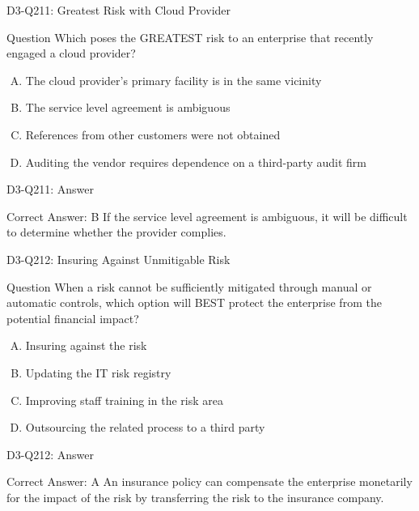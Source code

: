 \documentclass{beamer}
\begin{document}
	\begin{frame}{D3-Q211: Greatest Risk with Cloud Provider}
		\begin{block}{Question}
			Which poses the GREATEST risk to an enterprise that recently engaged a cloud provider?
		\end{block}
		\begin{enumerate}[(A)]
			\item The cloud provider's primary facility is in the same vicinity
			\item The service level agreement is ambiguous
			\item References from other customers were not obtained
			\item Auditing the vendor requires dependence on a third-party audit firm
		\end{enumerate}
	\end{frame}
	\begin{frame}{D3-Q211: Answer}
		\begin{block}{Correct Answer: B}
			If the service level agreement is ambiguous, it will be difficult to determine whether the provider complies.
		\end{block}
	\end{frame}
	
	\begin{frame}{D3-Q212: Insuring Against Unmitigable Risk}
		\begin{block}{Question}
			When a risk cannot be sufficiently mitigated through manual or automatic controls, which option will BEST protect the enterprise from the potential financial impact?
		\end{block}
		\begin{enumerate}[(A)]
			\item Insuring against the risk
			\item Updating the IT risk registry
			\item Improving staff training in the risk area
			\item Outsourcing the related process to a third party
		\end{enumerate}
	\end{frame}
	\begin{frame}{D3-Q212: Answer}
		\begin{block}{Correct Answer: A}
			An insurance policy can compensate the enterprise monetarily for the impact of the risk by transferring the risk to the insurance company.
		\end{block}
	\end{frame}
	
\end{document}
